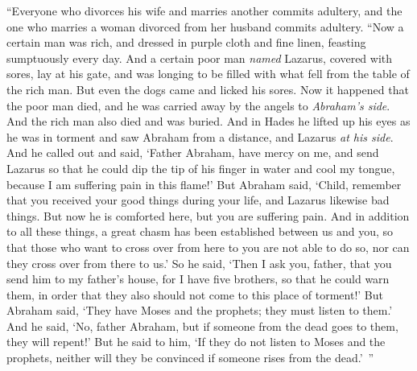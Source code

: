 \begin{biblechapter}
 “Everyone who divorces his wife and marries another commits adultery, and the one who marries a woman divorced from her husband commits adultery.
 “Now a certain man was rich, and dressed in purple cloth and fine linen, feasting sumptuously every day.
\verse And a certain poor man \textit{named} Lazarus, covered with sores, lay at his gate,
\verse and was longing to be filled with what fell from the table of the rich man. But even the dogs came and licked his sores.
\verse Now it happened that the poor man died, and he was carried away by the angels to \textit{Abraham’s side}. And the rich man also died and was buried.
\verse And in Hades he lifted up his eyes as he was in torment and saw Abraham from a distance, and Lazarus \textit{at his side}.
\verse And he called out and said, ‘Father Abraham, have mercy on me, and send Lazarus so that he could dip the tip of his finger in water and cool my tongue, because I am suffering pain in this flame!’
\verse But Abraham said, ‘Child, remember that you received your good things during your life, and Lazarus likewise bad things. But now he is comforted here, but you are suffering pain.
\verse And in addition to all these things, a great chasm has been established between us and you, so that those who want to cross over from here to you are not able to do so, nor can they cross over from there to us.’
\verse So he said, ‘Then I ask you, father, that you send him to my father’s house,
\verse for I have five brothers, so that he could warn them, in order that they also should not come to this place of torment!’
\verse But Abraham said, ‘They have Moses and the prophets; they must listen to them.’
\verse And he said, ‘No, father Abraham, but if someone from the dead goes to them, they will repent!’
\verse But he said to him, ‘If they do not listen to Moses and the prophets, neither will they be convinced if someone rises from the dead.’ ”
\end{biblechapter}

